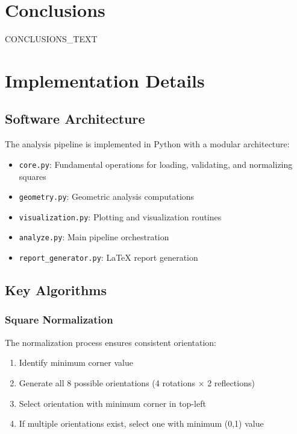 \documentclass[11pt]{article}
\begin{document}
\section{Conclusions}
\label{sec:conclusions}
CONCLUSIONS_TEXT

\section{Implementation Details}
\label{sec:implementation}

\subsection{Software Architecture}
The analysis pipeline is implemented in Python with a modular architecture:
\begin{itemize}
    \item \texttt{core.py}: Fundamental operations for loading, validating, and normalizing squares
    \item \texttt{geometry.py}: Geometric analysis computations
    \item \texttt{visualization.py}: Plotting and visualization routines
    \item \texttt{analyze.py}: Main pipeline orchestration
    \item \texttt{report\_generator.py}: LaTeX report generation
\end{itemize}

\subsection{Key Algorithms}
\subsubsection{Square Normalization}
The normalization process ensures consistent orientation:
\begin{enumerate}
    \item Identify minimum corner value
    \item Generate all 8 possible orientations (4 rotations × 2 reflections)
    \item Select orientation with minimum corner in top-left
    \item If multiple orientations exist, select one with minimum (0,1) value
\end{enumerate}
\end{document}
